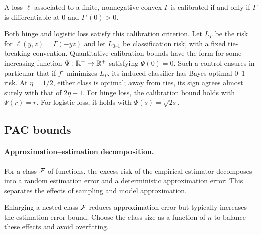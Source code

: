 \begin{prop}
	A loss  $\ell$ associated to a finite, nonnegative convex $\Gamma$ is calibrated if and only if $\Gamma$ is differentiable at $0$ and $\Gamma'(0)>0$.
\end{prop}

Both hinge and logistic loss satisfy this calibration criterion.
% 
Let $L_\Gamma$ be the risk for $\ell(y,z)=\Gamma(-yz)$ and let $L_{0\text{--}1}$ be classification risk, with a fixed tie-breaking convention. Quantitative calibration bounds have the form
for some increasing function $\Psi : \mathbb{R}^+ \rightarrow \mathbb{R}^+$ satisfying $\Psi(0)=0$. Such a control ensures in particular that if $f^\star$ minimizes $L_{\Gamma}$, its induced classifier has Bayes-optimal 0--1 risk. At $\eta=1/2$, either class is optimal; away from ties, its sign agrees almost surely with that of $2\eta-1$.
%
For hinge loss, the calibration bound holds with $\Psi(r)=r$. For logistic loss, it holds with $\Psi(s)=\sqrt{2s}$.


\subsection{PAC bounds}

\paragraph{Approximation--estimation decomposition.}

For a class $\mathcal{F}$ of functions, the excess risk of the empirical estimator
decomposes into a random estimation error and a deterministic approximation error:
This separates the effects of sampling and model approximation.

Enlarging a nested class $\mathcal{F}$ reduces approximation error but typically increases the estimation-error bound. Choose the class size as a function of $n$ to balance these effects and avoid overfitting.

